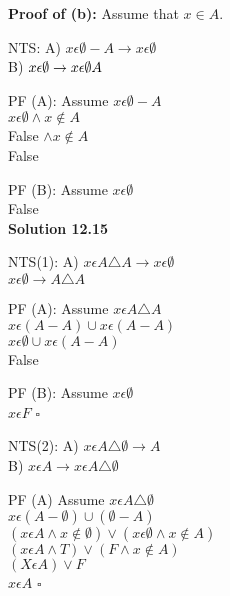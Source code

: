 \documentclass[12pt]{article}
\begin{document}
\noindent \textbf{Proof of (b):}  Assume that $x \in A$.  
\vspace{.15in} 

\item NTS: A) $x \epsilon \emptyset - A \rightarrow x \epsilon \emptyset$ \\ 
\indent B) $ x\epsilon \emptyset \rightarrow x \epsilon \emptyset \- A$  \\ 
\item PF (A): Assume $x \epsilon \emptyset - A$ \\ 
\rightarrow $x \epsilon \emptyset \wedge x \notin A$ \\
\rightarrow False $ \wedge x \notin A$ \\ 
\rightarrow False \;\; \square \\ 

\item PF (B): Assume $x \epsilon \emptyset$ \\ 
\rightarrow False \;\; \square \\


\textbf{Solution 12.15}
\item NTS(1): A) $x \epsilon A \triangle A \rightarrow x \epsilon \emptyset$  \\ 
\indent $x \epsilon \emptyset \rightarrow A \triangle A$ \\ 
\item PF (A): Assume $x \epsilon A \triangle A$ \\ 
\rightarrow $x \epsilon (A-A) \cup x \epsilon (A-A)$ \\ 
\rightarrow $x \epsilon \emptyset \cup x \epsilon (A-A)$ \\ 
\rightarrow False \;\; \square \\ 

\item PF (B): Assume $x \epsilon \emptyset$ \\ 
\rightarrow $x \epsilon F$ \;\; $\square$ \\ 

\item NTS(2): A) $x \epsilon A \triangle \emptyset \rightarrow A$ \\ 
\indent B) $x \epsilon A \rightarrow x \epsilon A \triangle \emptyset$ \\ 

\item PF (A) Assume $x \epsilon A \triangle \emptyset$ \\ 
\rightarrow $x \epsilon (A - \emptyset ) \cup ( \emptyset - A)$ \\ 
\rightarrow $(x \epsilon A \wedge x \notin \emptyset) \vee (x \epsilon \emptyset \wedge x \notin A) $ \\ 
\rightarrow $(x \epsilon A \wedge T) \vee (F \wedge x \notin A)$ \\ 
\rightarrow $(X\epsilon A) \vee F$ \\ 
\rightarrow $x \epsilon A$ \;\; $\square$ \\ 
\end{document}
